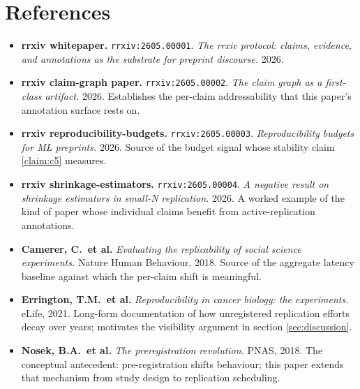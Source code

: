 \documentclass{rrxiv}
\begin{document}
\section{References}
\begin{itemize}[leftmargin=*]
\item \textbf{rrxiv whitepaper.} \texttt{rrxiv:2605.00001}. \emph{The rrxiv protocol: claims, evidence, and annotations as the substrate for preprint discourse.} 2026.
\item \textbf{rrxiv claim-graph paper.} \texttt{rrxiv:2605.00002}. \emph{The claim graph as a first-class artifact.} 2026. Establishes the per-claim addressability that this paper's annotation surface rests on.
\item \textbf{rrxiv reproducibility-budgets.} \texttt{rrxiv:2605.00003}. \emph{Reproducibility budgets for ML preprints.} 2026. Source of the budget signal whose stability claim \ref{claim:c5} measures.
\item \textbf{rrxiv shrinkage-estimators.} \texttt{rrxiv:2605.00004}. \emph{A negative result on shrinkage estimators in small-N replication.} 2026. A worked example of the kind of paper whose individual claims benefit from active-replication annotations.
\item \textbf{Camerer, C.\ et al.} \emph{Evaluating the replicability of social science experiments.} Nature Human Behaviour, 2018. Source of the aggregate latency baseline against which the per-claim shift is meaningful.
\item \textbf{Errington, T.M.\ et al.} \emph{Reproducibility in cancer biology: the experiments.} eLife, 2021. Long-form documentation of how unregistered replication efforts decay over years; motivates the visibility argument in section \ref{sec:discussion}.
\item \textbf{Nosek, B.A.\ et al.} \emph{The preregistration revolution.} PNAS, 2018. The conceptual antecedent: pre-registration shifts behaviour; this paper extends that mechanism from study design to replication scheduling.
\end{itemize}
\end{document}
